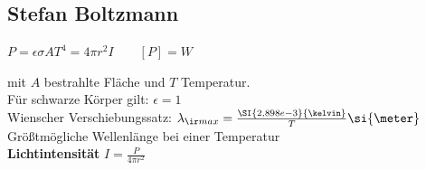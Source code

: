 \begin{sectionbox}
	\subsection{Stefan Boltzmann}
	\begin{emphbox}
		$P=\epsilon \sigma A T^4 = 4 \pi r^2 I \qquad [P]=W$
	\end{emphbox}
	mit $A$ bestrahlte Fläche und $T$ Temperatur. \\
	Für schwarze Körper gilt: $\epsilon = 1$\\
	Wienscher Verschiebungssatz: $\lambda_{\ir max}=\frac{\SI{2,898e-3}{\kelvin}}{T} \si{\meter}$ \\
	Größtmögliche Wellenlänge bei einer Temperatur \\

	\textbf{Lichtintensität} $I=\frac{P}{4\pi r^2}$
\end{sectionbox}